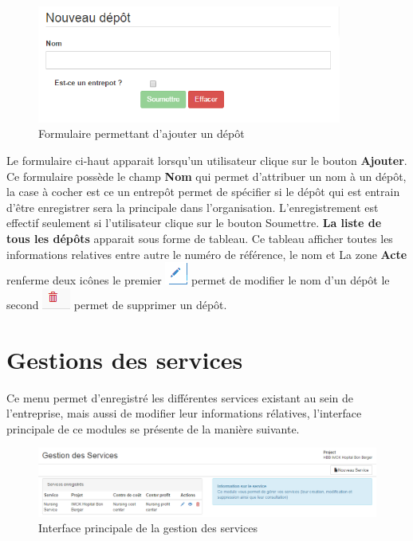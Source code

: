 \documentclass[12pt,a4paper]{report}
\begin{document}
\begin{figure}[h]
\begin{center}
\includegraphics[width=10cm]{pic/NewStore.png}
\end{center}
\caption{Formulaire permettant d'ajouter un dépôt}
\label{Formulaire permettant d'ajouter un dépôt}
\end{figure}

Le formulaire ci-haut apparait lorsqu'un utilisateur clique sur le bouton \textbf{Ajouter}. Ce formulaire possède le champ \textbf{Nom} qui permet d'attribuer un nom à un dépôt, la case à cocher est ce un entrepôt permet de spécifier si le dépôt qui est entrain d'être enregistrer sera la principale dans l'organisation.
L'enregistrement est effectif seulement si l'utilisateur clique sur le bouton Soumettre. \textbf{La liste de tous les dépôts} apparait sous forme de tableau. Ce tableau afficher toutes les informations relatives entre autre le numéro de référence, le nom et La zone \textbf{Acte} renferme deux icônes le premier \includegraphics[scale=0.7]{pic/EditUser.png}  permet de modifier le nom d'un dépôt le second \includegraphics[scale=0.7]{pic/DeleteWRed.png}  permet de supprimer un dépôt.
\newpage

\section{Gestions des services}
Ce menu permet d'enregistré les différentes services existant au sein de l'entreprise, mais aussi de modifier leur informations rélatives, l'interface principale de ce modules se présente de la manière suivante.

\begin{figure}[h]
\begin{center}
\includegraphics[width=14cm]{pic/AdminService.png}
\end{center}
\caption{Interface principale de la gestion des services}
\label{Interface principale de la gestion des services}
\end{figure}
\end{document}
